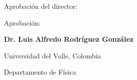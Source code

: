 \newpage
\thispagestyle{empty}

Aprobación del director: 

\vspace*{4 in}

Aprobación: \hrulefill

\hspace*{0mm}\phantom{Aprobación: }\textbf{Dr. Luis Alfredo Rodríguez González}

\hspace*{0mm}\phantom{Aprobación: }Universidad del Valle, Colombia 

\hspace*{0mm}\phantom{Aprobación: }Departamento de Física

